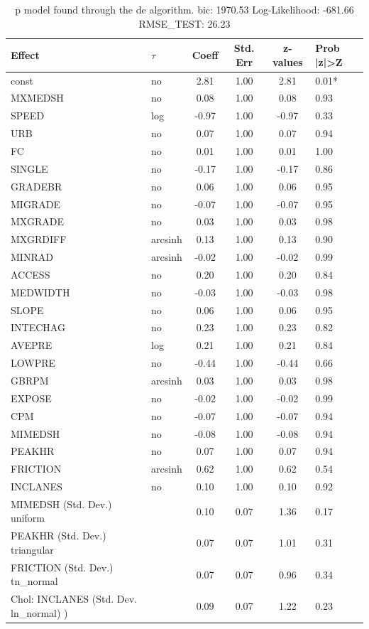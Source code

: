 \begin{table}
	\caption{p model found through the de algorithm. bic: 1970.53 Log-Likelihood: -681.66 RMSE_TEST: 26.23}
	\begin{center}
		\begin{tabular}{|l|l|c|c|c|l|}
			\hline
			Effect & $\tau$ & Coeff & Std. Err & z-values & Prob |z|>Z \\
			\hline
			const & no & 2.81 & 1.00 & 2.81 & 0.01* \\
			\hline
			MXMEDSH & no & 0.08 & 1.00 & 0.08 & 0.93 \\
			\hline
			SPEED & log & -0.97 & 1.00 & -0.97 & 0.33 \\
			\hline
			URB & no & 0.07 & 1.00 & 0.07 & 0.94 \\
			\hline
			FC & no & 0.01 & 1.00 & 0.01 & 1.00 \\
			\hline
			SINGLE & no & -0.17 & 1.00 & -0.17 & 0.86 \\
			\hline
			GRADEBR & no & 0.06 & 1.00 & 0.06 & 0.95 \\
			\hline
			MIGRADE & no & -0.07 & 1.00 & -0.07 & 0.95 \\
			\hline
			MXGRADE & no & 0.03 & 1.00 & 0.03 & 0.98 \\
			\hline
			MXGRDIFF & arcsinh & 0.13 & 1.00 & 0.13 & 0.90 \\
			\hline
			MINRAD & arcsinh & -0.02 & 1.00 & -0.02 & 0.99 \\
			\hline
			ACCESS & no & 0.20 & 1.00 & 0.20 & 0.84 \\
			\hline
			MEDWIDTH & no & -0.03 & 1.00 & -0.03 & 0.98 \\
			\hline
			SLOPE & no & 0.06 & 1.00 & 0.06 & 0.95 \\
			\hline
			INTECHAG & no & 0.23 & 1.00 & 0.23 & 0.82 \\
			\hline
			AVEPRE & log & 0.21 & 1.00 & 0.21 & 0.84 \\
			\hline
			LOWPRE & no & -0.44 & 1.00 & -0.44 & 0.66 \\
			\hline
			GBRPM & arcsinh & 0.03 & 1.00 & 0.03 & 0.98 \\
			\hline
			EXPOSE & no & -0.02 & 1.00 & -0.02 & 0.99 \\
			\hline
			CPM & no & -0.07 & 1.00 & -0.07 & 0.94 \\
			\hline
			MIMEDSH & no & -0.08 & 1.00 & -0.08 & 0.94 \\
			\hline
			PEAKHR & no & 0.07 & 1.00 & 0.07 & 0.94 \\
			\hline
			FRICTION & arcsinh & 0.62 & 1.00 & 0.62 & 0.54 \\
			\hline
			INCLANES & no & 0.10 & 1.00 & 0.10 & 0.92 \\
			\hline
			MIMEDSH (Std. Dev.) uniform &  & 0.10 & 0.07 & 1.36 & 0.17 \\
			\hline
			PEAKHR (Std. Dev.) triangular &  & 0.07 & 0.07 & 1.01 & 0.31 \\
			\hline
			FRICTION (Std. Dev.) tn_normal &  & 0.07 & 0.07 & 0.96 & 0.34 \\
			\hline
			 Chol: INCLANES (Std. Dev. ln_normal) ) &  & 0.09 & 0.07 & 1.22 & 0.23 \\
			\hline
		\end{tabular}
	\end{center}
\end{table}
